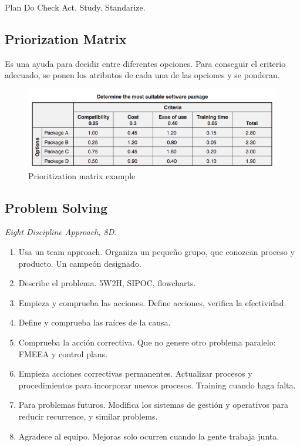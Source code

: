 \documentclass[]{article}
\begin{document}
Plan Do Check Act. Study. Standarize.

\subsection{Priorization Matrix}

Es una ayuda para decidir entre diferentes opciones. Para conseguir el criterio adecuado, se ponen los atributos de cada una de las opciones y se ponderan.

\begin{figure}[ht!]
	\centering
	\includegraphics[width=120mm]{imagenes/Prioritizationmatrixexample.png}
	\caption{Prioritization matrix example}
	\label{fig:Prioritizationmatrixexample}
\end{figure}

\subsection{Problem Solving}

\textit{Eight Discipline Approach, 8D}. 

\begin{enumerate}
	\item Usa un team approach. Organiza un pequeño grupo, que conozcan proceso y producto. Un campeón designado.
	\item Describe el problema. 5W2H, SIPOC, flowcharts.
	\item Empieza y comprueba las acciones. Define acciones, verifica la efectividad.
	\item Define y comprueba las raíces de la causa. 
	\item Comprueba la acción correctiva. Que no genere otro problema paralelo: FMEEA y control plans.
	\item Empieza acciones correctivas permanentes. Actualizar procesos y procedimientos para incorporar nuevos procesos. Training cuando haga falta.
	\item Para problemas futuros. Modifica los sistemas de gestión y operativos para reducir recurrence, y similar problems.
	\item Agradece al equipo. Mejoras solo ocurren cuando la gente trabaja junta.
\end{enumerate}
\end{document}
